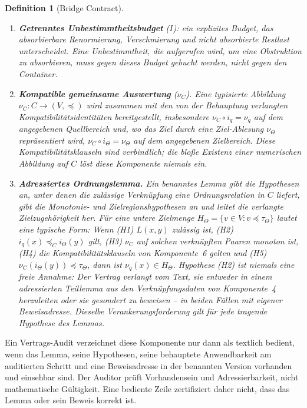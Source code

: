 \documentclass[11pt,a4paper]{article}
\newtheorem{definition}{Definition}[section]
\begin{document}
\begin{definition}[Bridge Contract]
\begin{enumerate}
    mathematische Relation.
  \item \textbf{Getrenntes Unbestimmtheitsbudget} ($I$): ein explizites
    Budget, das absorbierbare Renormierung, Verschmierung und
    \emph{nicht absorbierte Restlast} unterscheidet. Eine Unbestimmtheit, die
    aufgerufen wird, um eine Obstruktion zu absorbieren, muss gegen dieses
    Budget gebucht werden, nicht gegen den Container.
  \item \textbf{Kompatible gemeinsame Auswertung} ($\nu_C$). Eine typisierte
    Abbildung $\nu_C\colon C\to(V,\preceq)$ wird zusammen mit den von der
    Behauptung verlangten Kompatibilitätsidentitäten bereitgestellt,
    insbesondere $\nu_C\circ i_q=\nu_q$ auf dem angegebenen Quellbereich und,
    wo das Ziel durch eine Ziel-Ablesung $\nu_\Theta$ repräsentiert wird,
    $\nu_C\circ i_\Theta=\nu_\Theta$ auf dem angegebenen Zielbereich. Diese
    Kompatibilitätsklauseln sind verbindlich; die bloße Existenz einer
    numerischen Abbildung auf $C$ löst diese Komponente niemals ein.
  \item \textbf{Adressiertes Ordnungslemma.} Ein benanntes Lemma gibt die
    Hypothesen an, unter denen die zulässige Verknüpfung eine
    Ordnungsrelation in $C$ liefert, gibt die Monotonie- und
    Zielregionshypothesen an und leitet die verlangte Zielzugehörigkeit her.
    Für eine untere Zielmenge $H_\Theta=\{v\in V:v\preceq\tau_\Theta\}$
    lautet eine typische Form: Wenn (H1) $L(x,y)$ zulässig ist, (H2)
    $i_q(x)\preceq_C i_\Theta(y)$ gilt, (H3) $\nu_C$ auf solchen verknüpften
    Paaren monoton ist, (H4) die Kompatibilitätsklauseln von Komponente~6
    gelten und (H5) $\nu_C(i_\Theta(y))\preceq\tau_\Theta$, dann ist
    $\nu_q(x)\in H_\Theta$. Hypothese (H2) ist niemals eine freie Annahme:
    Der Vertrag verlangt vom Text, sie entweder in einem adressierten
    Teillemma aus den Verknüpfungsdaten von Komponente~4 \emph{herzuleiten}
    oder sie gesondert zu beweisen -- in beiden Fällen mit eigener
    Beweisadresse. Dieselbe Verankerungsforderung gilt für jede tragende
    Hypothese des Lemmas.
\end{enumerate}
\end{definition}

Ein Vertrags-Audit verzeichnet diese Komponente nur dann als textlich
bedient, wenn das Lemma, seine Hypothesen, seine behauptete Anwendbarkeit am
auditierten Schritt und eine Beweisadresse in der benannten Version vorhanden
und einsehbar sind. Der Auditor prüft Vorhandensein und Adressierbarkeit,
nicht mathematische Gültigkeit. Eine bediente Zeile zertifiziert daher nicht,
dass das Lemma oder sein Beweis korrekt ist.
\end{document}
